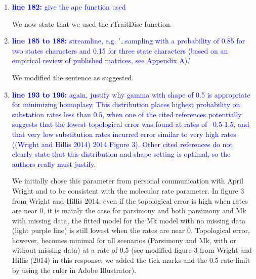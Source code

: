 \documentclass[12pt,letterpaper]{article}
\begin{document}
\begin{enumerate}
\item{\textcolor{blue}{\textbf{line 182:} give the ape function used}}

We now state that we used the rTraitDisc function.

\item{\textcolor{blue}{\textbf{line 185 to 188:} streamline, e.g. '…sampling with a probability of 0.85 for two states characters and 0.15 for three state characters (based on an empirical review of published matrices, see Appendix A).'}}

We modified the sentence as suggested.

\item{\textcolor{blue}{\textbf{line 193 to 196:} again, justify why gamma with shape of 0.5 is appropriate for minimizing homoplasy. This distribution places highest probability on substation rates less than 0.5, when one of the cited references potentially suggests that the lowest topological error was found at rates of ~0.5-1.5, and that very low substitution rates incurred error similar to very high rates ((Wright and Hillis 2014) 2014 Figure 3). Other cited references do not clearly state that this distribution and shape setting is optimal, so the authors really must justify. }}

We initially chose this parameter from personal communication with April Wright and to be consistent with the molecular rate parameter.
In figure 3 from Wright and Hillis 2014, even if the topological error is high when rates are near 0, it is mainly the case for parsimony and both parsimony and Mk with missing data, the fitted model for the Mk model with no missing data (light purple line) is still lowest when the rates are near 0.
Topological error, however, becomes minimal for all scenarios (Parsimony and Mk, with or without missing data) at a rate of 0.5 (see modified figure 3 from Wright and Hillis (2014) in this response; we added the tick marks and the 0.5 rate limit by using the ruler in Adobe Illustrator).


\end{enumerate}
\end{document}
